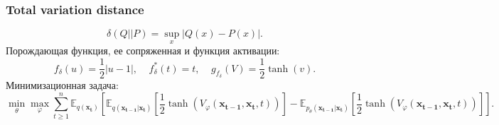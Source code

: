 \documentclass{article}
\begin{document}
\subsubsection{Total variation distance}
\begin{equation}
	\delta (Q||P) = \sup\limits_x|Q(x) - P(x)|.
\end{equation}
Порождающая функция, ее сопряженная и функция активации:
\begin{equation}
	f_{\delta}(u) = \frac{1}{2}|u-1|, ~~~~~ f^*_{\delta}(t) = t, ~~~~~ g_{f_{\delta}}(V) = \frac{1}{2}\tanh{(v)}.
\end{equation}
Минимизационная задача:
\begin{equation}
	\min\limits_\theta\max\limits_\varphi\sum\limits_{t\geqslant 1}^n \mathbb{E}_{q(\mathbf{x_t})}\left[\mathbb{E}_{q(\mathbf{x_{t-1}}|\mathbf{x_t})}\left[\frac{1}{2}\tanh{(V_\varphi(\mathbf{x_{t-1}}, \mathbf{x_t}, t))}\right] - \mathbb{E}_{p_\theta(\mathbf{x_{t-1}}|\mathbf{x_t})}\left[\frac{1}{2}\tanh{(V_\varphi(\mathbf{x_{t-1}}, \mathbf{x_t}, t))}\right]\right].
\end{equation}\\
\end{document}
